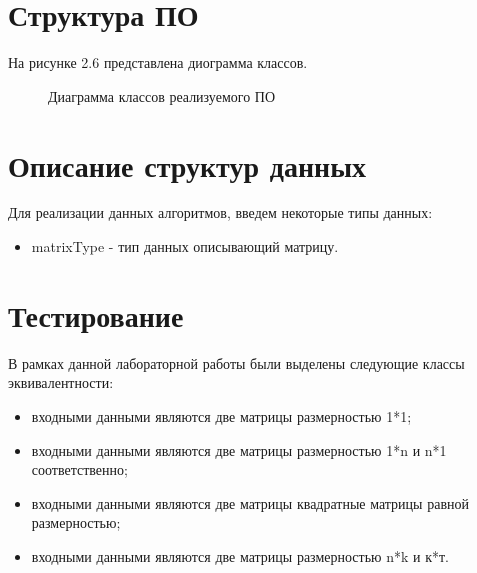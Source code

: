 \documentclass[12pt,a4paper]{report}
\begin{document}
\newpage
\section{Структура ПО}

На рисунке 2.6 представлена диограмма классов.


\begin{figure}[ht]
	\caption{Диаграмма классов реализуемого ПО}
\end{figure}


\section{Описание структур данных}

Для реализации данных алгоритмов, введем некоторые типы данных:

\begin{itemize}
	\item matrixType - тип данных описывающий матрицу.
\end{itemize}


\section{Тестирование}

В рамках данной лабораторной работы были выделены следующие классы эквивалентности:
\begin{itemize}
	\item входными данными являются две матрицы размерностью 1*1;
	\item входными данными являются две матрицы размерностью 1*n и n*1 соответственно;
	\item входными данными являются две матрицы квадратные матрицы равной размерностью;
	\item входными данными являются две матрицы размерностью n*k и к*т.
\end{itemize}
\end{document}
